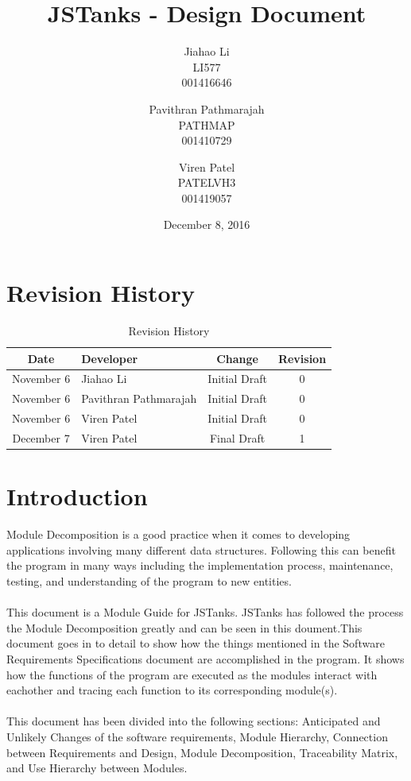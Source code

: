\documentclass{article}
\begin{document}
\newpage
\title{JSTanks - Design Document}
\date{December 8, 2016}
\author{Jiahao Li\\LI577\\001416646\and Pavithran Pathmarajah\\PATHMAP\\
001410729 \and Viren Patel\\PATELVH3\\001419057}

\maketitle

\newpage
{}
\tableofcontents

\newpage
\section{Revision History}
\begin{table}[H]
\caption{Revision History}
	\begin{tabularx}{\textwidth}{cXcc}
		\toprule
		Date & Developer & Change&Revision\\
		\midrule
		November 6&Jiahao Li &Initial Draft&0 \\
		November 6&Pavithran Pathmarajah &Initial Draft&0\\
		November 6&Viren Patel  &Initial Draft&0\\
		December 7&Viren Patel &Final Draft&1\\
	\end{tabularx}
\end{table}

\section{Introduction}
Module Decomposition is a good practice when it comes to developing applications involving many different data structures. Following this can benefit the program in many ways including the implementation process, maintenance, testing, and understanding of the program to new entities.\\ \\
This document is a Module Guide for JSTanks. JSTanks has followed the process the Module Decomposition greatly and can be seen in this doument.This document goes in to detail to show how the things mentioned in the Software Requirements Specifications document are accomplished in the program. It shows how the functions of the program are executed as the modules interact with eachother and tracing each function to its corresponding module(s). \\ \\
This document has been divided into the following sections: Anticipated and Unlikely Changes of the software requirements, Module Hierarchy, Connection between Requirements and Design, Module Decomposition, Traceability Matrix, and Use Hierarchy between Modules.
\end{document}
